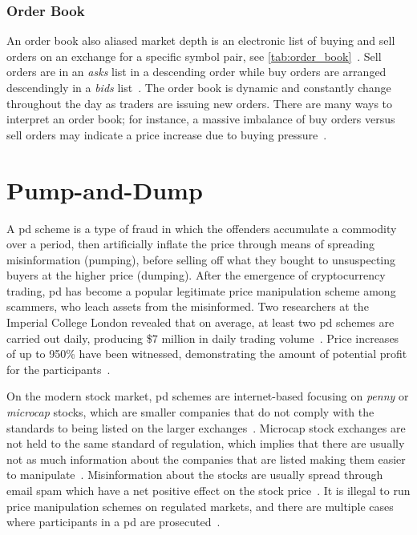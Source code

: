 \subsubsection{Order Book}
An order book also aliased market depth is an electronic list of buying and sell orders on an exchange for a specific symbol pair, see \autoref{tab:order_book}~\cite{investopedia_depth}. Sell orders are in an \emph{asks} list in a descending order while buy orders are arranged descendingly in a \emph{bids} list~\cite{invest_order_book, coincodex_order_book}. The order book is dynamic and constantly change throughout the day as traders are issuing new orders. There are many ways to interpret an order book; for instance, a massive imbalance of buy orders versus sell orders may indicate a price increase due to buying pressure~\cite{invest_order_book}.



\newpage
\section{Pump-and-Dump}\label{sec:pd}
A \ac{pd} scheme is a type of fraud in which the offenders accumulate a commodity over a period, then artificially inflate the price through means of spreading misinformation (pumping), before selling off what they bought to unsuspecting buyers at the higher price (dumping)\cite{P&D_to_the_moon}. After the emergence of cryptocurrency trading, \ac{pd} has become a popular legitimate price manipulation scheme among scammers, who leach assets from the misinformed. Two researchers at the Imperial College London revealed that on average, at least two \ac{pd} schemes are carried out daily, producing \$$7$ million in daily trading volume~\cite{P&D_MIT_crypto}. Price increases of up to 950\% have been witnessed, demonstrating the amount of potential profit for the participants~\cite{P&D_cointelegraph}.

On the modern stock market, \ac{pd} schemes are internet-based focusing on \emph{penny} or \emph{microcap} stocks, which are smaller companies that do not comply with the standards to being listed on the larger exchanges~\cite{stock_bouraoui, stock_temple}. Microcap stock exchanges are not held to the same standard of regulation, which implies that there are usually not as much information about the companies that are listed making them easier to manipulate~\cite{P&D_to_the_moon}. Misinformation about the stocks are usually spread through email spam which have a net positive effect on the stock price~\cite{stock_bouraoui}. It is illegal to run price manipulation schemes on regulated markets, and there are multiple cases where participants in a \ac{pd} are prosecuted~\cite{P&D_to_the_moon}.


